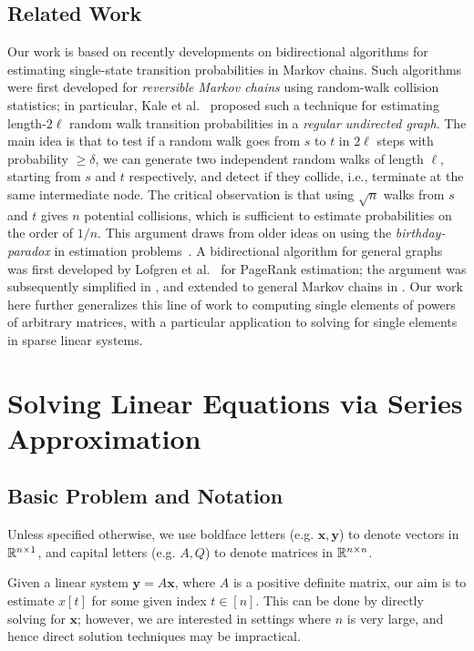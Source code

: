 \subsection{Related Work}

Our work is based on recently developments on bidirectional algorithms for estimating single-state transition probabilities in Markov chains.
Such algorithms were first developed for \emph{reversible Markov chains} using random-walk collision statistics; in particular, Kale et al.~\cite{Kale2008} proposed such a technique for estimating length-$2\ell$ random walk transition probabilities in a \emph{regular undirected graph}.
The main idea is that to test if a random walk goes from $s$ to $t$ in $2\ell$ steps with probability $\geq\delta$, we can generate two independent random walks of length $\ell$, starting from $s$ and $t$ respectively, and detect if they collide, i.e., terminate at the same intermediate node. 
The critical observation is that using $\sqrt{n}$ walks from $s$ and $t$ gives $n$ potential collisions, which is sufficient to estimate probabilities on the order of $1/n$.
This argument draws from older ideas on using the \emph{birthday-paradox} in estimation problems~\cite{Motwani2007}.
A bidirectional algorithm for general graphs was first developed by Lofgren et al.~\cite{Lofgren2014} for PageRank estimation; the argument was subsequently simplified in \cite{lofgren2016personalized}, and extended to general Markov chains in \cite{banerjee2015fast}. 
Our work here further generalizes this line of work to computing single elements of powers of arbitrary matrices, with a particular application to solving for single elements in sparse linear systems.



\section{Solving Linear Equations via Series Approximation}

\subsection{Basic Problem and Notation}

Unless specified otherwise, we use boldface letters (e.g. $\mathbf{x},\mathbf{y}$) to denote vectors in $\mathbb{R}^{n\times 1}$, and capital letters (e.g. $A,Q$) to denote matrices in $\mathbb{R}^{n\times n}$.


Given a linear system $\mathbf{y} = A\mathbf{x}$, where $A$ is a positive definite matrix, our aim is to estimate $x[t]$ for some given index $t\in[n]$. 
This can be done by directly solving for $\mathbf{x}$; however, we are interested in settings where $n$ is very large, and hence direct solution techniques may be impractical. 



